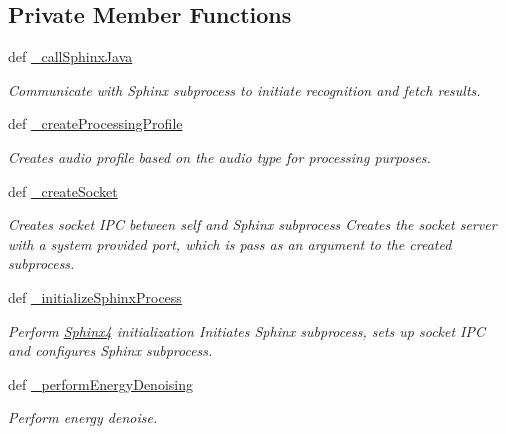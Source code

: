 \subsection*{Private Member Functions}
\begin{DoxyCompactItemize}
\item 
def \hyperlink{classrapp__speech__detection__sphinx4_1_1sphinx4__wrapper_1_1Sphinx4Wrapper_a9c2d4e36dea588b042ffdb1d05a04b9a}{\-\_\-call\-Sphinx\-Java}
\begin{DoxyCompactList}\small\item\em Communicate with Sphinx subprocess to initiate recognition and fetch results. \end{DoxyCompactList}\item 
def \hyperlink{classrapp__speech__detection__sphinx4_1_1sphinx4__wrapper_1_1Sphinx4Wrapper_a98ef1ddb945b8ba21b6aa5e0034561c2}{\-\_\-create\-Processing\-Profile}
\begin{DoxyCompactList}\small\item\em Creates audio profile based on the audio type for processing purposes. \end{DoxyCompactList}\item 
def \hyperlink{classrapp__speech__detection__sphinx4_1_1sphinx4__wrapper_1_1Sphinx4Wrapper_abfbb97cfec6c92e520dfe8733ca0a591}{\-\_\-create\-Socket}
\begin{DoxyCompactList}\small\item\em Creates socket I\-P\-C between self and Sphinx subprocess Creates the socket server with a system provided port, which is pass as an argument to the created subprocess. \end{DoxyCompactList}\item 
def \hyperlink{classrapp__speech__detection__sphinx4_1_1sphinx4__wrapper_1_1Sphinx4Wrapper_aa963466f3f98e9a961e6da6d20d8d3ca}{\-\_\-initialize\-Sphinx\-Process}
\begin{DoxyCompactList}\small\item\em Perform \hyperlink{classSphinx4}{Sphinx4} initialization Initiates Sphinx subprocess, sets up socket I\-P\-C and configures Sphinx subprocess. \end{DoxyCompactList}\item 
def \hyperlink{classrapp__speech__detection__sphinx4_1_1sphinx4__wrapper_1_1Sphinx4Wrapper_a850a6644cf5feb280c65f1f08466610c}{\-\_\-perform\-Energy\-Denoising}
\begin{DoxyCompactList}\small\item\em Perform energy denoise. \end{DoxyCompactList}\item 

\end{DoxyCompactItemize}
